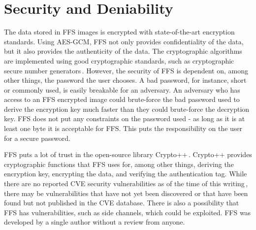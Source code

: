 \section{Security and Deniability}
\label{sec:dis_sec}
The data stored in \gls{FFS} images is encrypted with \mbox{state-of-the-art} encryption standards. Using \gls{AES}-\gls{GCM}, \gls{FFS} not only provides confidentiality of the data, but it also provides the authenticity of the data. The cryptographic algorithms are implemented using good cryptographic standards, such as cryptographic secure number generators\,\cite{RandomNumberGeneratorCryptoWiki2021}. However, the security of \gls{FFS} is dependent on, among other things, the password the user chooses. A bad password, for instance, short or commonly used, is easily breakable for an adversary. An adversary who has access to an \gls{FFS} encrypted image could \mbox{brute-force} the bad password used to derive the encryption key much faster than they could \mbox{brute-force} the decryption key. \gls{FFS} does not put any constraints on the password used - as long as it is at least one byte it is acceptable for \gls{FFS}. This puts the responsibility on the user for a secure password. 

\gls{FFS} puts a lot of trust in the \mbox{open-source} library Crypto++\,\cite{CryptoLibraryFree}. Crypto++ provides cryptographic functions that \gls{FFS} uses for, among other things, deriving the encryption key, encrypting the data, and verifying the authentication tag. While there are no reported CVE security vulnerabilities as of the time of this writing\,\cite{CryptoppSecurityVulnerabilities}, there may be vulnerabilities that have not yet been discovered or that have been found but not published in the CVE database. There is also a possibility that \gls{FFS} has vulnerabilities, such as side channels, which could be exploited. \gls{FFS} was developed by a single author without a review from anyone.

